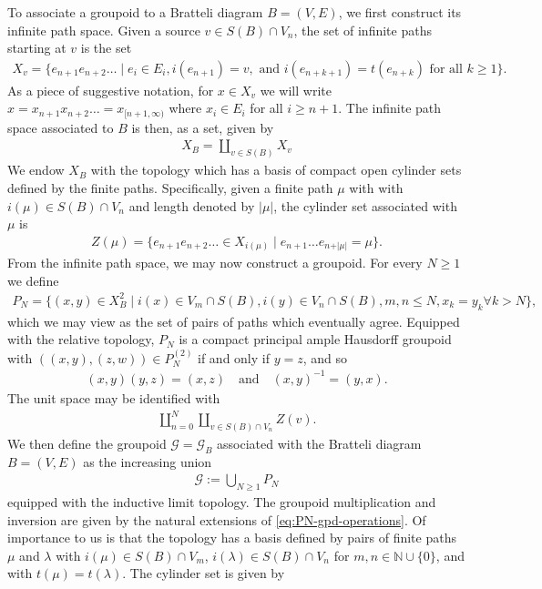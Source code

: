 \documentclass[11pt,a4paper,oneside,final,reqno]{amsart}
\theoremstyle{definition}
\newcommand{\G}{\mathcal{G}}
\newcommand{\N}{\mathbb{N}}
\numberwithin{equation}{section}
\begin{document}
	To associate a groupoid to a Bratteli diagram $B = (V,E)$, we first construct its infinite path space. Given a source $v \in S(B) \cap V_n$, the set of infinite paths starting at $v$ is the set
	\begin{align*}
		X_v = \{ e_{n+1} e_{n+2} \ldots \mid e_i \in E_i, i(e_{n+1}) = v, \text{ and } i(e_{n+k+1}) = t(e_{n+k}) \text{ for all $k\geq 1$} \}.
	\end{align*}
	As a piece of suggestive notation, for $x \in X_v$ we will write $x = x_{n+1} x_{n+2} \ldots = x_{[n+1, \infty)}$ where $x_i \in E_i$ for all $i \geq n+1$. The infinite path space associated to $B$ is then, as a set, given by
	\begin{align*}
		X_B = \coprod_{v \in S(B)} X_v
	\end{align*}
	We endow $X_B$ with the topology which has a basis of compact open cylinder sets defined by the finite paths. Specifically, given a finite path $\mu$ with with $i(\mu) \in S(B) \cap V_n$ and length denoted by $\vert \mu \vert$, the cylinder set associated with $\mu$ is
	\begin{align*}
		Z(\mu) = \{ e_{n+1} e_{n+2} \ldots \in X_{i(\mu)} \mid e_{n+1} \ldots e_{n+ \vert \mu \vert} = \mu  \}.
	\end{align*}
	From the infinite path space, we may now construct a groupoid. 
	For every $N \geq 1$ we define
	\begin{align}\label{eq:def-inf-path-space}
		P_N = \{ (x,y) \in X_B^2 \mid i(x) \in V_m \cap S(B), i(y) \in V_n \cap S(B), m,n\leq N, x_k = y_k \forall k> N   \},
	\end{align}
	which we may view as the set of pairs of paths which eventually agree. Equipped with the relative topology, $P_N$ is a compact principal ample Hausdorff groupoid with $((x,y),(z,w)) \in P_N^{(2)}$ if and only if $y=z$, and so
	\begin{align}\label{eq:PN-gpd-operations}
		(x,y)(y,z) = (x,z) \quad \text{and} \quad (x,y)^{-1} = (y,x).
	\end{align}
	The unit space may be identified with
	\begin{align*}
		\coprod_{n=0}^N \coprod_{v \in S(B) \cap V_n} Z(v).
	\end{align*}
	We then define the groupoid $\G = \G_B$ associated with the Bratteli diagram $B=(V,E)$ as the increasing union
	\begin{align*}
		\G := \bigcup_{N\geq 1} P_N
	\end{align*}
	equipped with the inductive limit topology. The groupoid multiplication and inversion are given by the natural extensions of \eqref{eq:PN-gpd-operations}. Of importance to us is that the topology has a basis defined by pairs of finite paths $\mu$ and $\lambda$ with $i(\mu) \in S(B) \cap V_m$, $i(\lambda) \in S(B) \cap V_n$ for $m,n \in \N \cup \{0\}$, and with $t(\mu) = t(\lambda)$. The cylinder set is given by
\end{document}
